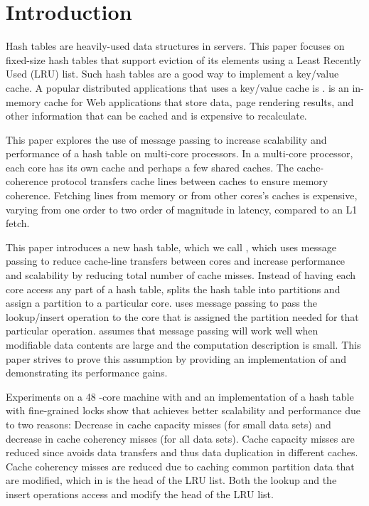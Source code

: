 \section{Introduction}
\label{chap:intro}

Hash tables are heavily-used data structures in servers. This paper focuses on fixed-size hash tables that support eviction of its elements using a Least Recently Used (LRU) list. Such hash tables are a good way to implement a key/value cache. A popular distributed applications that uses a key/value cache is \memcached{} \cite{memcached}. \memcached{} is an in-memory cache for Web applications that store data, page rendering results, and other information that can be cached and is expensive to recalculate.

This paper explores the use of message passing to increase scalability and performance of a hash table on multi-core processors.  In a multi-core processor, each core has its own cache and perhaps a few shared caches.  The cache-coherence protocol transfers cache lines between caches to ensure memory coherence.  Fetching lines from memory or from other cores's caches is expensive, varying from one order to two order of magnitude in latency, compared to an L1 fetch.

This paper introduces a new hash table, which we call \cphash{}, which uses message passing to reduce cache-line transfers between cores and increase performance and scalability by reducing total number of cache misses. Instead of having each core access any part of a hash table, \cphash{} splits the hash table into partitions and assign a partition to a particular core. \cphash{} uses message passing to pass the lookup/insert operation to the core that is assigned the partition needed for that particular operation. \cphash{} assumes that message passing will work well when modifiable data contents are large and the computation description is small. This paper strives to prove this assumption by providing an implementation of \cphash{} and demonstrating its performance gains.

Experiments on a 48  -core machine with \cphash{} and an implementation of a hash table with fine-grained locks show that \cphash{} achieves better scalability and performance due to two reasons: Decrease in cache capacity misses (for small data sets) and decrease in cache coherency misses (for all data sets).  Cache capacity misses are reduced since \cphash{} avoids data transfers and thus data duplication in different caches. Cache coherency misses are reduced due to caching common partition data that are modified, which in \cphash{} is the head of the LRU list. Both the lookup and the insert operations access and modify the head of the LRU list.

